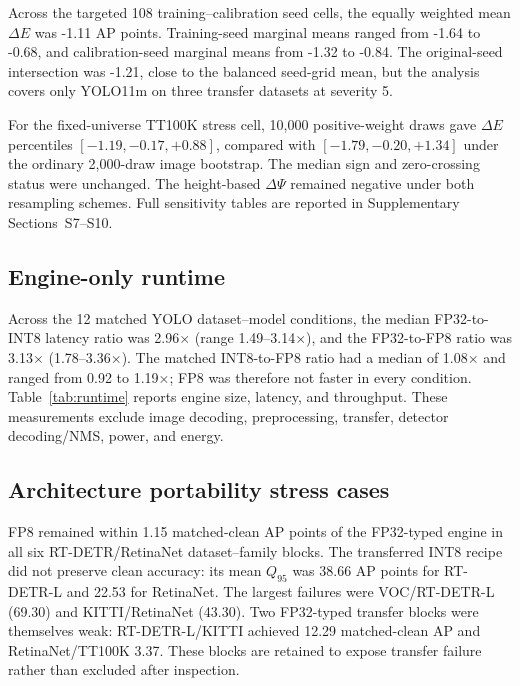 Across the targeted 108 training--calibration seed cells, the equally weighted
mean $\Delta E$ was -1.11 AP points. Training-seed marginal means ranged from
-1.64 to -0.68, and calibration-seed marginal means from -1.32 to -0.84. The
original-seed intersection was -1.21, close to the balanced seed-grid mean, but
the analysis covers only YOLO11m on three transfer datasets at severity 5.

For the fixed-universe TT100K stress cell, 10,000 positive-weight draws gave
$\Delta E$ percentiles $[-1.19,-0.17,+0.88]$, compared with
$[-1.79,-0.20,+1.34]$ under the ordinary 2,000-draw image bootstrap. The
median sign and zero-crossing status were unchanged. The height-based
$\Delta\Psi$ remained negative under both resampling schemes. Full sensitivity
tables are reported in Supplementary Sections~S7--S10.

\subsection{Engine-only runtime}
\label{sec:runtime-results}

Across the 12 matched YOLO dataset--model conditions, the median FP32-to-INT8
latency ratio was 2.96$\times$ (range 1.49--3.14$\times$), and the
FP32-to-FP8 ratio was 3.13$\times$ (1.78--3.36$\times$). The matched
INT8-to-FP8 ratio had a median of 1.08$\times$ and ranged from 0.92 to
1.19$\times$; FP8 was therefore not faster in every condition. Table~\ref{tab:runtime}
reports engine size, latency, and throughput. These measurements exclude image
decoding, preprocessing, transfer, detector decoding/NMS, power, and energy.

\begin{table}[t]
\centering
\caption{RTX 5090 TensorRT engine measurements. Condition values are medians of
three raw-log-validated invocations; rows are medians across 12 matched
conditions.}
\label{tab:runtime}
\resizebox{0.82\textwidth}{!}{}
\end{table}

\subsection{Architecture portability stress cases}
\label{sec:crossfamily-results}

FP8 remained within 1.15 matched-clean AP points of the FP32-typed engine in all
six RT-DETR/RetinaNet dataset--family blocks. The transferred INT8 recipe did
not preserve clean accuracy: its mean $Q_{95}$ was 38.66 AP points for RT-DETR-L
and 22.53 for RetinaNet. The largest failures were VOC/RT-DETR-L (69.30) and
KITTI/RetinaNet (43.30). Two FP32-typed transfer blocks were themselves weak:
RT-DETR-L/KITTI achieved 12.29 matched-clean AP and RetinaNet/TT100K 3.37.
These blocks are retained to expose transfer failure rather than excluded after
inspection.

